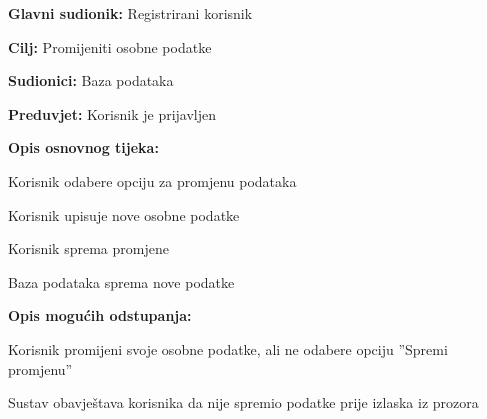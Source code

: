 \noindent {}
\begin{packed_item}
	
	\item \textbf{Glavni sudionik: }Registrirani korisnik
	\item  \textbf{Cilj:} Promijeniti osobne podatke
	\item  \textbf{Sudionici:} Baza podataka
	\item  \textbf{Preduvjet:} Korisnik je prijavljen
	\item  \textbf{Opis osnovnog tijeka:}
	
	\item[] \begin{packed_enum}
		
		\item Korisnik odabere opciju za promjenu podataka
		\item Korisnik upisuje nove osobne podatke
		\item Korisnik sprema promjene
		\item Baza podataka sprema nove podatke
	\end{packed_enum}
	
	\item  \textbf{Opis mogućih odstupanja:}
	
	\item[] \begin{packed_item}
		
		\item[3.a] Korisnik promijeni svoje osobne podatke, ali ne odabere opciju ”Spremi promjenu”
		
		\item[] \begin{packed_enum}
			
			\item Sustav obavještava korisnika da nije spremio podatke prije izlaska iz prozora
			
		\end{packed_enum}
		
		
	\end{packed_item}
\end{packed_item}

